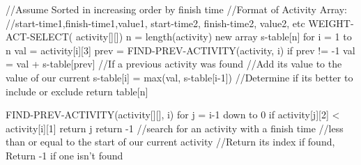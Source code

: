 //Assume Sorted in increasing order by finish time
//Format of Activity Array: 
//{{start-time1,finish-time1,value1}, {start-time2, finish-time2, value2}, etc}
WEIGHT-ACT-SELECT( activity[][])
	n = length(activity)
	new array s-table[n]
	for i = 1 to n
		val = activity[i][3]
		prev = FIND-PREV-ACTIVITY(activity, i)
		if prev != -1
			val = val + s-table[prev]
		//If a previous activity was found
		//Add its value to the value of our current
		s-table[i] = max(val, s-table[i-1])
		//Determine if its better to include or exclude
	return table[n]
		
FIND-PREV-ACTIVITY(activity[][], i)
	for j = i-1 down to 0
		if activity[j][2] < activity[i][1]
			return j
	return -1
	//search for an activity with a finish time
	//less than or equal to the start of our current activity
	//Return its index if found, Return -1 if one isn't found






